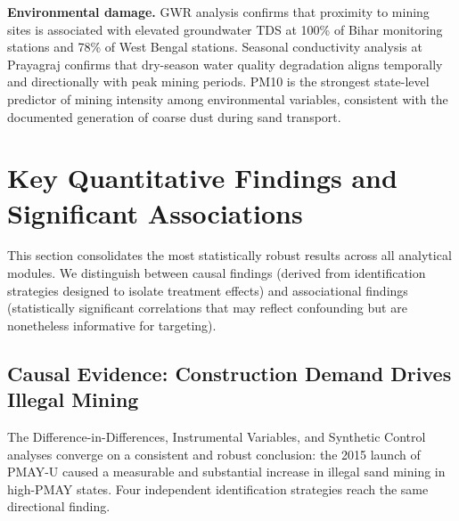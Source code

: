 \documentclass[12pt]{article}
\begin{document}
\textbf{Environmental damage.} GWR analysis confirms that proximity to mining sites is associated with elevated groundwater TDS at 100\% of Bihar monitoring stations and 78\% of West Bengal stations. Seasonal conductivity analysis at Prayagraj confirms that dry-season water quality degradation aligns temporally and directionally with peak mining periods. PM10 is the strongest state-level predictor of mining intensity among environmental variables, consistent with the documented generation of coarse dust during sand transport.

\section{Key Quantitative Findings and Significant Associations}
\label{sec:findings}

This section consolidates the most statistically robust results across all analytical modules. We distinguish between causal findings (derived from identification strategies designed to isolate treatment effects) and associational findings (statistically significant correlations that may reflect confounding but are nonetheless informative for targeting).

\subsection{Causal Evidence: Construction Demand Drives Illegal Mining}

The Difference-in-Differences, Instrumental Variables, and Synthetic Control analyses converge on a consistent and robust conclusion: the 2015 launch of PMAY-U caused a measurable and substantial increase in illegal sand mining in high-PMAY states. Four independent identification strategies reach the same directional finding.
\end{document}
